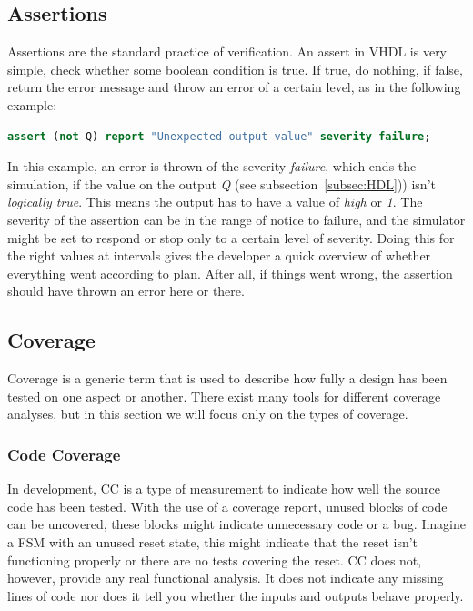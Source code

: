 \documentclass[11pt,british]{article}
\begin{document}
\subsection{Assertions}
\label{subsec:assertions}
Assertions are the standard practice of verification. An assert in VHDL is very simple, check whether some boolean condition is true. If true, do nothing, if false, return the error message and throw an error of a certain level, as in the following example:
\begin{lstlisting}[language=VHDL, tabsize=4, frame=single, framesep=2mm, belowskip=8pt, aboveskip=8pt, showstringspaces=false]
assert (not Q) report "Unexpected output value" severity failure;
\end{lstlisting}
In this example, an error is thrown of the severity \emph{failure}, which ends the simulation, if the value on the output \emph{Q} (see subsection~\ref{subsec:HDL})) isn't \emph{logically true}. This means the output has to have a value of \emph{high} or \emph{1}. The severity of the assertion can be in the range of notice to failure, and the simulator might be set to respond or stop only to a certain level of severity. Doing this for the right values at intervals gives the developer a quick overview of whether everything went according to plan. After all, if things went wrong, the assertion should have thrown an error here or there.

\subsection{Coverage}
Coverage is a generic term that is used to describe how fully a design has been tested on one aspect or another. There exist many tools for different coverage analyses, but in this section we will focus only on the types of coverage.

\subsubsection{Code Coverage}
In development, \gls{CC} is a type of measurement to indicate how well the source code has been tested. With the use of a coverage report, unused blocks of code can be uncovered, these blocks might indicate unnecessary code or a bug. Imagine a \gls{FSM} with an unused reset state, this might indicate that the reset isn't functioning properly or there are no tests covering the reset. CC does not, however, provide any real functional analysis. It does not indicate any missing lines of code nor does it tell you whether the inputs and outputs behave properly.
\end{document}
